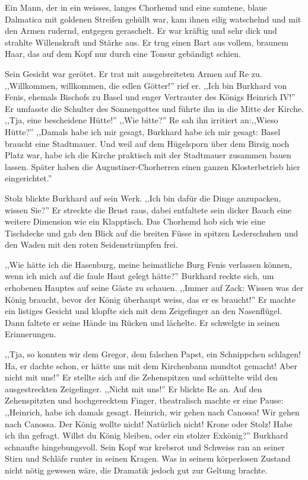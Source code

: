 \documentclass[11pt,titlepage,a5paper]{book}
\begin{document}
Ein Mann, der in ein weisses, langes Chorhemd und eine samtene, blaue Dalmatica mit goldenen Streifen gehüllt war, kam ihnen eilig watschelnd und mit den Armen rudernd, entgegen geraschelt. Er war kräftig und sehr dick und strahlte Willenskraft und Stärke aus. Er trug einen Bart aus vollem, braunem Haar, das auf dem Kopf nur durch eine Tonsur gebändigt schien.

Sein Gesicht war gerötet. Er trat mit ausgebreiteten Armen auf Re zu. ,,Willkommen, willkommen, die edlen Götter!'' rief er. ,,Ich bin Burkhard von Fenis, ehemals Bischofs zu Basel und enger Vertrauter des Königs Heinrich IV!'' Er umfasste die Schulter des Sonnengottes und führte ihn in die Mitte der Kirche. ,,Tja, eine bescheidene Hütte!'' ,,Wie bitte?'' Re sah ihn irritiert an:,,Wieso Hütte?'' ,,Damals habe ich mir gesagt, Burkhard habe ich mir gesagt: Basel braucht eine Stadtmauer. Und weil auf dem Hügelsporn über dem Birsig noch Platz war, habe ich die Kirche praktisch mit der Stadtmauer zusammen bauen lassen. Später haben die Augustiner-Chorherren einen ganzen Klosterbetrieb hier eingerichtet.''

Stolz blickte Burkhard auf sein Werk. ,,Ich bin dafür die Dinge anzupacken, wissen Sie?'' Er streckte die Brust raus, dabei entfaltete sein dicker Bauch eine weitere Dimension wie ein Klapptisch. Das Chorhemd hob sich wie eine Tischdecke und gab den Blick auf die breiten Füsse in spitzen Lederschuhen und den Waden mit den roten Seidenstrümpfen frei. 

,,Wie hätte ich die Hasenburg, meine heimatliche Burg Fenis verlassen können, wenn ich mich auf die faule Haut gelegt hätte?'' Burkhard reckte sich, um erhobenen Hauptes auf seine Gäste zu schauen. ,,Immer auf Zack: Wissen was der König braucht, bevor der König überhaupt weiss, das er es braucht!'' Er machte ein listiges Gesicht und klopfte sich mit dem Zeigefinger an den Nasenflügel. Dann faltete er seine Hände im Rücken und lächelte. Er schwelgte in seinen Erinnerungen.

,,Tja, so konnten wir dem Gregor, dem falschen Papst, ein Schnippchen schlagen! Ha, er dachte schon, er hätte uns mit dem Kirchenbann mundtot gemacht! Aber nicht mit uns!'' Er stellte sich auf die Zehenspitzen und schüttelte wild den ausgestreckten Zeigefinger. ,,Nicht mit uns!'' Er blickte Re an. Auf den Zehenspitzten und hochgerecktem Finger, theatralisch machte er eine Pause: ,,Heinrich, habe ich damals gesagt. Heinrich, wir gehen nach Canossa! Wir gehen nach Canossa. Der König wollte nicht! Natürlich nicht! Krone oder Stolz! Habe ich ihn gefragt. Willst du König bleiben, oder ein stolzer Exkönig?'' Burkhard schnaufte hingebungsvoll. Sein Kopf war krebsrot und Schweiss ran an seiner Stirn und Schläfe runter in seinen Kragen. Was in seinem körperlosen Zustand nicht nötig gewesen wäre, die Dramatik jedoch gut zur Geltung brachte.
\end{document}
